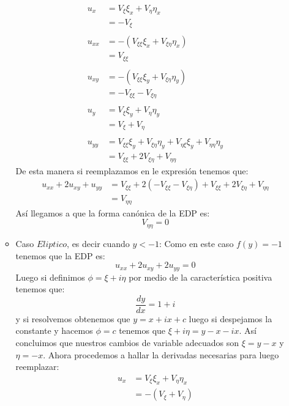\begin{homeworkProblem}
\begin{itemize}
\begin{solucion}
\begin{itemize}
             \begin{align*}
                 u_x&=V_\xi\xi_x+V_\eta\eta_x\\
                 &=-V_\xi\\
                 \\
                 u_{xx}&=-(V_{\xi\xi}\xi_x+V_{\xi\eta}\eta_x)\\
                 &=V_{\xi\xi}\\
                 \\
                 u_{xy}&=-(V_{\xi\xi}\xi_y+V_{\xi\eta}\eta_y)\\
                 &=-V_{\xi\xi}-V_{\xi\eta}\\
                 \\
                 u_y&=V_\xi\xi_y+V_\eta\eta_y\\
                 &=V_\xi+V_\eta\\
                 \\
                 u_{yy}&=V_{\xi\xi}\xi_y+V_{\xi\eta}\eta_y+V_{\eta\xi}\xi_y+V_{\eta\eta}\eta_y\\
                 &=V_{\xi\xi}+2V_{\xi\eta}+V_{\eta\eta}
             \end{align*}
             De esta manera si reemplazamos en le expresión tenemos que:
             \begin{align*}
                 u_{xx}+2u_{xy}+u_{yy}&=V_{\xi\xi}+2(-V_{\xi\xi}-V_{\xi\eta})+V_{\xi\xi}+2V_{\xi\eta}+V_{\eta\eta}\\
                 &=V_{\eta\eta}
             \end{align*}
             Así llegamos a que la forma canónica de la EDP es:
             $$V_{\eta\eta}=0$$
             \item Caso $Eliptico$, es decir cuando $y<-1$: Como en este caso $f(y)=-1$ tenemos que la EDP es:
             $$u_{xx}+2u_{xy}+2u_{yy}=0$$
             Luego si definimos $\phi=\xi+i\eta$ por medio de la característica positiva tenemos que:
             $$\dfrac{dy}{dx}=1+i$$
             y si resolvemos obtenemos que $y=x+ix+c$ luego si despejamos la constante y hacemos $\phi=c$ tenemos que $\xi+i\eta=y-x-ix$. Así concluimos que nuestros cambios de variable adecuados son $\xi=y-x$ y $\eta=-x$. Ahora procedemos a hallar la derivadas necesarias para luego reemplazar:
             \begin{align*}
                  u_x&=V_\xi\xi_x+V_\eta\eta_x\\
                  &=-(V_\xi+V_\eta)\\

\end{align*}
\end{itemize}
\end{solucion}
\end{itemize}
\end{homeworkProblem}
